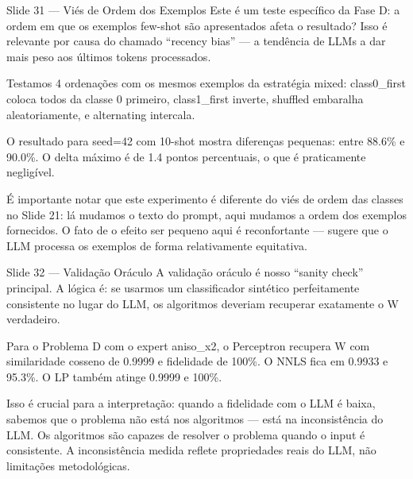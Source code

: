 \documentclass[aspectratio=169,11pt]{beamer}
\begin{document}
\begin{frame}{Slide 31 --- Viés de Ordem dos Exemplos}
\small
Este é um teste específico da Fase D: a ordem em que os exemplos few-shot são apresentados afeta o resultado? Isso é relevante por causa do chamado ``recency bias'' --- a tendência de LLMs a dar mais peso aos últimos tokens processados.

Testamos 4 ordenações com os mesmos exemplos da estratégia mixed: class0\_first coloca todos da classe 0 primeiro, class1\_first inverte, shuffled embaralha aleatoriamente, e alternating intercala.

O resultado para seed=42 com 10-shot mostra diferenças pequenas: entre 88.6\% e 90.0\%. O delta máximo é de 1.4 pontos percentuais, o que é praticamente negligível.

É importante notar que este experimento é diferente do viés de ordem das classes no Slide 21: lá mudamos o texto do prompt, aqui mudamos a ordem dos exemplos fornecidos. O fato de o efeito ser pequeno aqui é reconfortante --- sugere que o LLM processa os exemplos de forma relativamente equitativa.
\end{frame}

\begin{frame}{Slide 32 --- Validação Oráculo}
\small
A validação oráculo é nosso ``sanity check'' principal. A lógica é: se usarmos um classificador sintético perfeitamente consistente no lugar do LLM, os algoritmos deveriam recuperar exatamente o W verdadeiro.

Para o Problema D com o expert aniso\_x2, o Perceptron recupera W com similaridade cosseno de 0.9999 e fidelidade de 100\%. O NNLS fica em 0.9933 e 95.3\%. O LP também atinge 0.9999 e 100\%.

Isso é crucial para a interpretação: quando a fidelidade com o LLM é baixa, sabemos que o problema não está nos algoritmos --- está na inconsistência do LLM. Os algoritmos são capazes de resolver o problema quando o input é consistente. A inconsistência medida reflete propriedades reais do LLM, não limitações metodológicas.
\end{frame}
\end{document}
